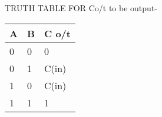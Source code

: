 \documentclass{article}
\begin{document}
TRUTH TABLE FOR Co/t to be output-

\begin{table}[]
\begin{tabular}{|l|l|l|} \hline
A & B & C o/t  \\ \hline
0 & 0 & 0      \\
0 & 1 & C(in)  \\
1 & 0 & C(in)  \\
1 & 1 & 1      \\ \hline
\end{tabular}
\end{table}
\end{document}
